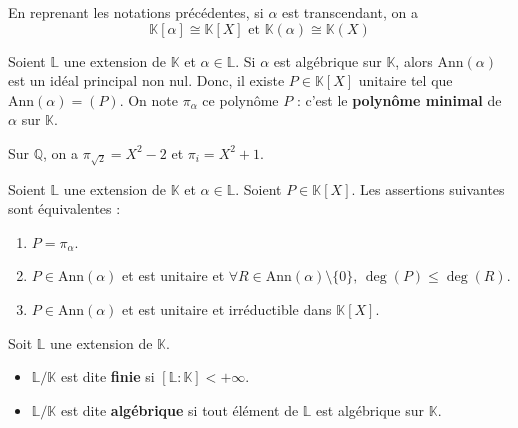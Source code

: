   \begin{proposition}
    En reprenant les notations précédentes, si $\alpha$ est transcendant, on a
    \[ \mathbb{K}[\alpha] \cong \mathbb{K}[X] \text{ et } \mathbb{K}(\alpha) \cong \mathbb{K}(X) \]
  \end{proposition}

  \begin{definition}
    Soient $\mathbb{L}$ une extension de $\mathbb{K}$ et $\alpha \in \mathbb{L}$. Si $\alpha$ est algébrique sur $\mathbb{K}$, alors $\mathrm{Ann}(\alpha)$ est un idéal principal non nul. Donc, il existe $P \in \mathbb{K}[X]$ unitaire tel que $\mathrm{Ann}(\alpha) = (P)$. On note $\pi_\alpha$ ce polynôme $P$ : c'est le \textbf{polynôme minimal} de $\alpha$ sur $\mathbb{K}$.
  \end{definition}

  \begin{example}
    Sur $\mathbb{Q}$, on a $\pi_{\sqrt{2}} = X^2 - 2$ et $\pi_i = X^2 + 1$.
  \end{example}


  \begin{proposition}
    Soient $\mathbb{L}$ une extension de $\mathbb{K}$ et $\alpha \in \mathbb{L}$. Soient $P \in \mathbb{K}[X]$. Les assertions suivantes sont équivalentes :
    \begin{enumerate}[label=(\roman*)]
      \item $P = \pi_\alpha$.
      \item $P \in \mathrm{Ann}(\alpha)$ et est unitaire et $\forall R \in \mathrm{Ann}(\alpha) \setminus \{ 0 \}, \, \deg(P) \leq \deg(R)$.
      \item $P \in \mathrm{Ann}(\alpha)$ et est unitaire et irréductible dans $\mathbb{K}[X]$.
    \end{enumerate}
  \end{proposition}


  \begin{definition}
    Soit $\mathbb{L}$ une extension de $\mathbb{K}$.
    \begin{itemize}
      \item $\mathbb{L}/\mathbb{K}$ est dite \textbf{finie} si $[\mathbb{L}:\mathbb{K}] < +\infty$.
      \item $\mathbb{L}/\mathbb{K}$ est dite \textbf{algébrique} si tout élément de $\mathbb{L}$ est algébrique sur $\mathbb{K}$.
    \end{itemize}
  \end{definition}

